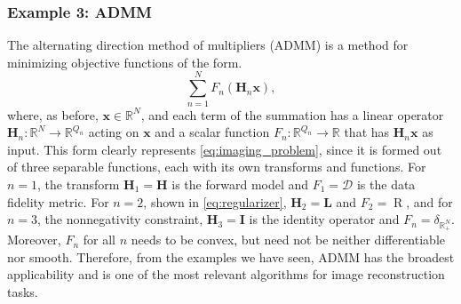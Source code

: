



\subsubsection{Example 3: ADMM} \label{sect:admm}

The alternating direction method of multipliers (ADMM) \cite{boyd_distributed_2011} is a method for minimizing objective functions of the form.
\begin{equation}
    \sum_{n=1}^{N}F_n(\mathbf{H}_n\mathbf{x}),
    \label{eq:ADMM_obj}
\end{equation}
where, as before, $\mathbf{x} \in \mathbb{R}^N$, and each term of the summation has a linear operator $\mathbf{H}_n: \mathbb{R}^N \rightarrow \mathbb{R}^{Q_n}$ acting on $\mathbf{x}$ and a scalar function $F_n: \mathbb{R}^{Q_n} \rightarrow \mathbb{R}$ that has $\mathbf{H}_n\mathbf{x}$ as input. This form clearly represents \eqref{eq:imaging_problem}, since it is formed out of three separable functions, each with its own transforms and functions. For $n = 1$, the transform $\mathbf{H}_1 = \mathbf{H}$ is the forward model and $F_1 = \mathcal{D}$ is the data fidelity metric. For $n=2$, shown in \eqref{eq:regularizer}, $\mathbf{H}_2 = \mathbf{L}$ and $F_2 = \operatorname{R}$, and for $n=3$, the nonnegativity constraint, $\mathbf{H}_3 = \mathbf{I}$ is the identity operator and $F_n = \delta_{\mathbb{R}^N_+}$. Moreover, $F_n$ for all $n$ needs to be convex, but need not be neither differentiable nor smooth. Therefore, from the examples we have seen, ADMM has the broadest applicability and is one of the most relevant algorithms for image reconstruction tasks. 

